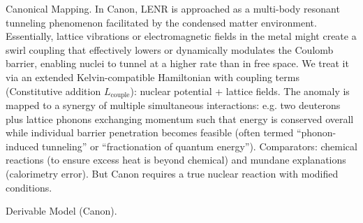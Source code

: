 \documentclass[11pt]{article}
\begin{document}
Canonical Mapping. In Canon, LENR is approached as a multi-body resonant tunneling phenomenon facilitated by the condensed matter environment. Essentially, lattice vibrations or electromagnetic fields in the metal might create a swirl coupling that effectively lowers or dynamically modulates the Coulomb barrier, enabling nuclei to tunnel at a higher rate than in free space. We treat it via an extended Kelvin-compatible Hamiltonian with coupling terms (Constitutive addition $L_{\text{couple}}$): nuclear potential + lattice fields. The anomaly is mapped to a synergy of multiple simultaneous interactions: e.g. two deuterons plus lattice phonons exchanging momentum such that energy is conserved overall while individual barrier penetration becomes feasible (often termed “phonon-induced tunneling” or “fractionation of quantum energy”). Comparators: chemical reactions (to ensure excess heat is beyond chemical) and mundane explanations (calorimetry error). But Canon requires a true nuclear reaction with modified conditions.


Derivable Model (Canon).
\end{document}

